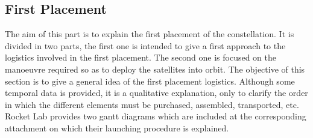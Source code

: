
\subsection{First Placement}
The aim of this part is to explain the first placement of the constellation. It is divided in two parts, the first one is intended to give a first approach to the logistics involved in the first placement. The second one is focused on the manoeuvre required so as to deploy the satellites into orbit. 
The objective of this section is to give a general idea of the first placement logistics. Although some temporal data is provided, it is a qualitative explanation, only to clarify the order in which the different elements must be purchased, assembled, transported, etc. %
Rocket Lab provides two gantt diagrams which are included at the corresponding attachment on which their launching procedure is explained.

%


